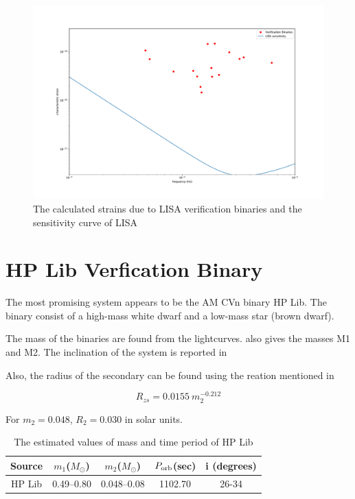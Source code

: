 \documentclass[10pt,a4paper]{article}
\begin{document}
\begin{figure}[ht]
\centering
\includegraphics[scale=0.25]{../Figures/strain_verific_binary.pdf}
\caption{The calculated strains due to LISA verification binaries and the sensitivity curve of LISA}
\end{figure}

\section{HP Lib Verfication Binary}

The most promising system appears to be the AM CVn binary HP Lib. The binary consist of a high-mass white dwarf and a low-mass star (brown dwarf).

The mass of the binaries are found from the lightcurves. \cite{Patterson} also gives the masses M1 and M2. The inclination of the system is reported in \cite{Roelofs}


Also, the radius of the secondary can be found using the reation mentioned in \citep{Patterson}

\begin{equation}
R_{zs} = 0.0155 \ m_2^{-0.212}
\end{equation}

For $m_2 = 0.048$, $R_2 = 0.030$ in solar units.

\begin{table}[H]
\centering
\begin{tabular}{|c|c|c|c|c|}
\hline 
\rule[-1ex]{0pt}{2.5ex} Source & $m_1$($M_{\odot}$) & $m_2$($M_{\odot}$) & $P_{\rm orb}$(sec) &i (degrees) \\ 
\hline 
\rule[-1ex]{0pt}{2.5ex} HP Lib & 0.49--0.80 & 0.048--0.08 & 1102.70 & 26-34\\ 
\hline 
\end{tabular}
\caption{The estimated values of mass and time period of HP Lib}
\label{table1}
\end{table}
\end{document}
